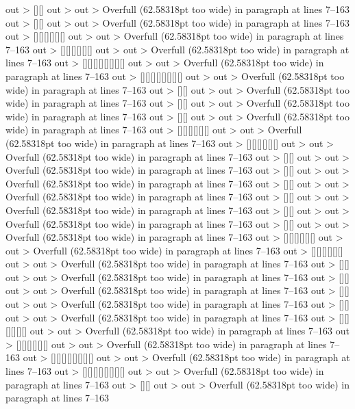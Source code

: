 out >  [][] 
out >
out > Overfull \hbox (62.58318pt too wide) in paragraph at lines 7--163
out >  [][] 
out >
out > Overfull \hbox (62.58318pt too wide) in paragraph at lines 7--163
out >  [][][][][][] 
out >
out > Overfull \hbox (62.58318pt too wide) in paragraph at lines 7--163
out >  [][][][][][] 
out >
out > Overfull \hbox (62.58318pt too wide) in paragraph at lines 7--163
out >  [][][][][][][][] 
out >
out > Overfull \hbox (62.58318pt too wide) in paragraph at lines 7--163
out >  [][][][][][][][] 
out >
out > Overfull \hbox (62.58318pt too wide) in paragraph at lines 7--163
out >  [][] 
out >
out > Overfull \hbox (62.58318pt too wide) in paragraph at lines 7--163
out >  [][] 
out >
out > Overfull \hbox (62.58318pt too wide) in paragraph at lines 7--163
out >  [][] 
out >
out > Overfull \hbox (62.58318pt too wide) in paragraph at lines 7--163
out >  [][][][][][] 
out >
out > Overfull \hbox (62.58318pt too wide) in paragraph at lines 7--163
out >  [][][][][][] 
out >
out > Overfull \hbox (62.58318pt too wide) in paragraph at lines 7--163
out >  [][] 
out >
out > Overfull \hbox (62.58318pt too wide) in paragraph at lines 7--163
out >  [][] 
out >
out > Overfull \hbox (62.58318pt too wide) in paragraph at lines 7--163
out >  [][] 
out >
out > Overfull \hbox (62.58318pt too wide) in paragraph at lines 7--163
out >  [][] 
out >
out > Overfull \hbox (62.58318pt too wide) in paragraph at lines 7--163
out >  [][] 
out >
out > Overfull \hbox (62.58318pt too wide) in paragraph at lines 7--163
out >  [][] 
out >
out > Overfull \hbox (62.58318pt too wide) in paragraph at lines 7--163
out >  [][][][][][] 
out >
out > Overfull \hbox (62.58318pt too wide) in paragraph at lines 7--163
out >  [][][][][][] 
out >
out > Overfull \hbox (62.58318pt too wide) in paragraph at lines 7--163
out >  [][] 
out >
out > Overfull \hbox (62.58318pt too wide) in paragraph at lines 7--163
out >  [][] 
out >
out > Overfull \hbox (62.58318pt too wide) in paragraph at lines 7--163
out >  [][] 
out >
out > Overfull \hbox (62.58318pt too wide) in paragraph at lines 7--163
out >  [][] 
out >
out > Overfull \hbox (62.58318pt too wide) in paragraph at lines 7--163
out >  [][][][][][] 
out >
out > Overfull \hbox (62.58318pt too wide) in paragraph at lines 7--163
out >  [][][][][][] 
out >
out > Overfull \hbox (62.58318pt too wide) in paragraph at lines 7--163
out >  [][][][][][][][] 
out >
out > Overfull \hbox (62.58318pt too wide) in paragraph at lines 7--163
out >  [][][][][][][][] 
out >
out > Overfull \hbox (62.58318pt too wide) in paragraph at lines 7--163
out >  [][] 
out >
out > Overfull \hbox (62.58318pt too wide) in paragraph at lines 7--163
